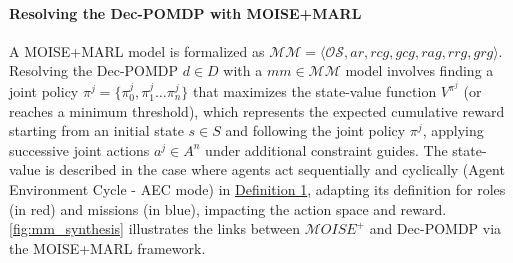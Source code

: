 \documentclass[pdflatex,sn-mathphys-num]{sn-jnl}%
\theoremstyle{thmstyleone}%
\theoremstyle{thmstyletwo}%
\theoremstyle{thmstylethree}%
\begin{document}
\paragraph{\textbf{Resolving the Dec-POMDP with MOISE+MARL}}

A MOISE+MARL model is formalized as $\mathcal{MM} = \langle \mathcal{OS}, ar, rcg, gcg, rag, rrg, grg\rangle$.
Resolving the Dec-POMDP $d \in D$ with a $mm \in \mathcal{MM}$ model involves finding a joint policy $\pi^{j} = \{\pi^j_0,\pi^j_1\dots\pi^j_n\}$ that maximizes the state-value function $V^{\pi^{j}}$ (or reaches a minimum threshold), which represents the expected cumulative reward starting from an initial state $s \in S$ and following the joint policy $\pi^{j}$, applying successive joint actions $a^{j} \in A^n$ under additional constraint guides. The state-value is described in the case where agents act sequentially and cyclically (Agent Environment Cycle - AEC mode) in \hyperref[eq:single_value_function]{Definition 1}, adapting its definition for roles (in red) and missions (in blue), impacting the action space and reward. \autoref{fig:mm_synthesis} illustrates the links between $\mathcal{M}OISE^+$ and Dec-POMDP via the MOISE+MARL framework.
\end{document}
